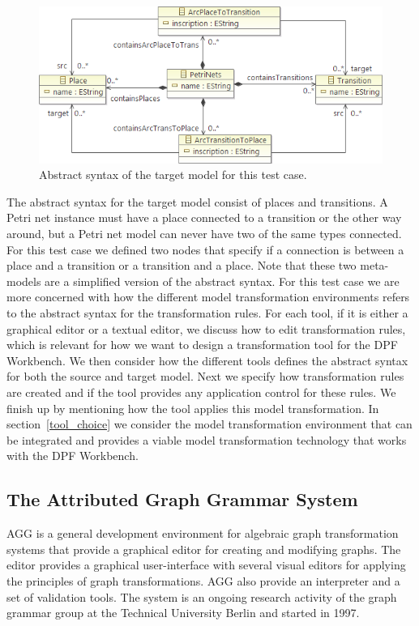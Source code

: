 \begin{figure}[H]
	\centering
	\includegraphics[scale=0.7]{./Figures/PetriNetsMetamodel.png}
	\caption[Abstract syntax of the target model]
	{Abstract syntax of the target model for this test case.}
	\label{fig:petrinet_metamodel}
\end{figure}

The abstract syntax for the target model consist of places and transitions. A
Petri net instance must have a place connected to a transition or the other way
around, but a Petri net model can never have two of the same types connected.
For this test case we defined two nodes that specify if a connection is between
a place and a transition or a transition and a place. Note that these two
meta-models are a simplified version of the abstract syntax. For this test case
we are more concerned with how the different model transformation environments
refers to the abstract syntax for the transformation rules. For each tool, if it
is either a graphical editor or a textual editor, we discuss how to edit
transformation rules, which is relevant for how we want to design a
transformation tool for the DPF Workbench. We then consider how the different
tools defines the abstract syntax for both the source and target model. Next we
specify how transformation rules are created and if the tool provides any
application control for these rules. We finish up by mentioning how the tool
applies this model transformation. In section~\ref{tool_choice} we consider the
model transformation environment that can be integrated and provides a viable
model transformation technology that works with the DPF Workbench.

\subsection{The Attributed Graph Grammar System}

AGG is a general development environment for algebraic graph
transformation systems that provide a graphical editor for creating
and modifying graphs. The editor provides a graphical user-interface with
several visual editors for applying the principles of graph transformations. AGG
also provide an interpreter and a set of validation tools. The system is an
ongoing research activity of the graph grammar group at the Technical University
Berlin and started in 1997.

